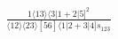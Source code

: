 \documentclass[varwidth, border=5pt]{standalone}
\begin{document}
\begin{my}
$\begin{gathered}
\scriptscriptstyle\frac{1⟨13⟩⟨3|1+2|5]^2}{⟨12⟩⟨23⟩[56]⟨1|2+3|4]s_{123}}
\end{gathered}$
\end{my}
\end{document}
